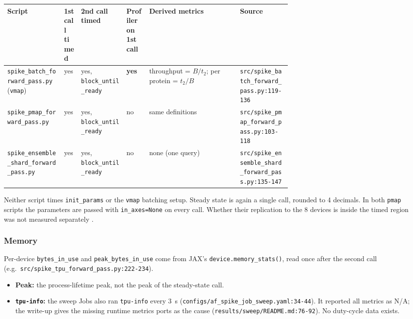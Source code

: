 \begin{center}\small
\begin{tabularx}{\linewidth}{>{\raggedright\arraybackslash}p{0.2\linewidth}>{\raggedright\arraybackslash}p{0.06\linewidth}>{\raggedright\arraybackslash}p{0.16\linewidth}>{\raggedright\arraybackslash}p{0.08\linewidth}>{\raggedright\arraybackslash}X>{\raggedright\arraybackslash}p{0.18\linewidth}}
\toprule
Script & 1st call timed & 2nd call timed & Profiler on 1st call & Derived metrics & Source \\
\midrule
\texttt{spike\_\allowbreak{}batch\_\allowbreak{}forward\_\allowbreak{}pass.py} (\texttt{vmap}) & yes & yes, \texttt{block\_until\_ready} & \textbf{yes} & throughput = $B / t_2$; per protein = $t_2 / B$ & \texttt{src/\allowbreak{}spike\_\allowbreak{}batch\_\allowbreak{}forward\_\allowbreak{}pass.py:119-136} \\
\texttt{spike\_\allowbreak{}pmap\_\allowbreak{}forward\_\allowbreak{}pass.py} & yes & yes, \texttt{block\_until\_ready} & no & same definitions & \texttt{src/\allowbreak{}spike\_\allowbreak{}pmap\_\allowbreak{}forward\_\allowbreak{}pass.py:103-118} \\
\texttt{spike\_\allowbreak{}ensemble\_\allowbreak{}shard\_\allowbreak{}forward\_\allowbreak{}pass.py} & yes & yes, \texttt{block\_until\_ready} & no & none (one query) & \texttt{src/\allowbreak{}spike\_\allowbreak{}ensemble\_\allowbreak{}shard\_\allowbreak{}forward\_\allowbreak{}pass.py:135-147} \\
\bottomrule
\end{tabularx}
\end{center}

Neither script times \texttt{init\_params} or the \texttt{vmap} batching setup. Steady state is
again a single call, rounded to 4 decimals. In both \texttt{pmap} scripts the
parameters are passed with \texttt{in\_axes=None} on every call. Whether their
replication to the 8 devices is inside the timed region was not measured
separately .

\subsubsection{Memory}
\label{sec:meth-timing-memory}

Per-device \texttt{bytes\_in\_use} and \texttt{peak\_bytes\_in\_use} come from JAX's
\texttt{device.memory\_\allowbreak{}stats()}, read once after the second call (e.g.\
\texttt{src/\allowbreak{}spike\_\allowbreak{}tpu\_\allowbreak{}forward\_\allowbreak{}pass.py:222-234}).
\begin{itemize}
  \item \textbf{Peak:} the process-lifetime peak, not the peak of the steady-state call.
  \item \textbf{\texttt{tpu-info}:} the sweep Jobs also ran \texttt{tpu-info} every 3~s
    (\texttt{configs/\allowbreak{}af\_\allowbreak{}spike\_\allowbreak{}job\_\allowbreak{}sweep.yaml:34-44}). It reported all metrics as N/A; the
    write-up gives the missing runtime metrics ports as the cause
    (\texttt{results/\allowbreak{}sweep/\allowbreak{}README.md:76-92}). No duty-cycle data exists.
\end{itemize}

